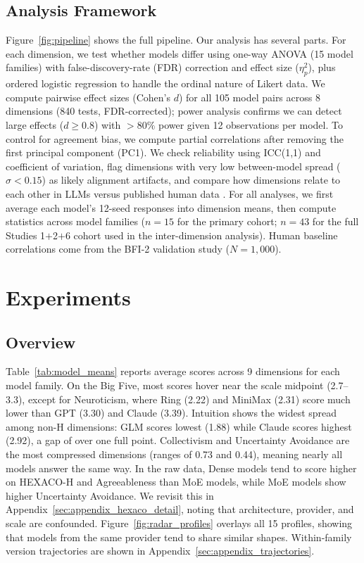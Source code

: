 \documentclass[11pt]{article}
\newcommand{\sd}{\sigma}
\begin{document}
\subsection{Analysis Framework}
\label{sec:analysis}

Figure~\ref{fig:pipeline} shows the full pipeline.
Our analysis has several parts.
For each dimension, we test whether models differ using one-way ANOVA (15 model families) with false-discovery-rate (FDR) correction \citep{benjamini1995controlling} and effect size ($\eta^2_p$), plus ordered logistic regression to handle the ordinal nature of Likert data.
We compute pairwise effect sizes (Cohen's $d$) for all 105 model pairs across 8 dimensions (840 tests, FDR-corrected); power analysis confirms we can detect large effects ($d \geq 0.8$) with $>80\%$ power given 12 observations per model.
To control for agreement bias, we compute partial correlations after removing the first principal component (PC1).
We check reliability using ICC(1,1) and coefficient of variation, flag dimensions with very low between-model spread ($\sd < 0.15$) as likely alignment artifacts, and compare how dimensions relate to each other in LLMs versus published human data \citep{john1999bigfive}.
For all analyses, we first average each model's 12-seed responses into dimension means, then compute statistics across model families ($n = 15$ for the primary cohort; $n = 43$ for the full Studies 1$+$2$+$6 cohort used in the inter-dimension analysis).
Human baseline correlations come from the BFI-2 validation study \citep{soto2017bfi2} ($N = 1{,}000$).

\section{Experiments}
\label{sec:results}

\FloatBarrier

\subsection{Overview}
\label{sec:overview}

Table~\ref{tab:model_means} reports average scores across 9 dimensions for each model family.
On the Big Five, most scores hover near the scale midpoint (2.7--3.3), except for Neuroticism, where Ring (2.22) and MiniMax (2.31) score much lower than GPT (3.30) and Claude (3.39).
Intuition shows the widest spread among non-H dimensions: GLM scores lowest (1.88) while Claude scores highest (2.92), a gap of over one full point.
Collectivism and Uncertainty Avoidance are the most compressed dimensions (ranges of 0.73 and 0.44), meaning nearly all models answer the same way.
In the raw data, Dense models tend to score higher on HEXACO-H and Agreeableness than MoE models, while MoE models show higher Uncertainty Avoidance. We revisit this in Appendix~\ref{sec:appendix_hexaco_detail}, noting that architecture, provider, and scale are confounded.
Figure~\ref{fig:radar_profiles} overlays all 15 profiles, showing that models from the same provider tend to share similar shapes.
Within-family version trajectories are shown in Appendix~\ref{sec:appendix_trajectories}.
\end{document}
